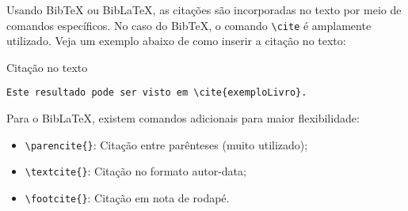 \noindent Usando BibTeX ou BibLaTeX, as citações são incorporadas no texto por meio de comandos específicos. No caso do BibTeX, o comando \verb|\cite| é amplamente utilizado. Veja um exemplo abaixo de como inserir a citação no texto:

\begin{trailer}{Citação no texto}
\begin{verbatim} 
Este resultado pode ser visto em \cite{exemploLivro}. \end{verbatim}
\end{trailer}

\noindent Para o BibLaTeX, existem comandos adicionais para maior flexibilidade:

\begin{itemize}
    \item \verb|\parencite{}|: Citação entre parênteses (muito utilizado);
    \item \verb|\textcite{}|: Citação no formato autor-data;
    \item \verb|\footcite{}|: Citação em nota de rodapé.
\end{itemize}

\enlargethispage{24pt}